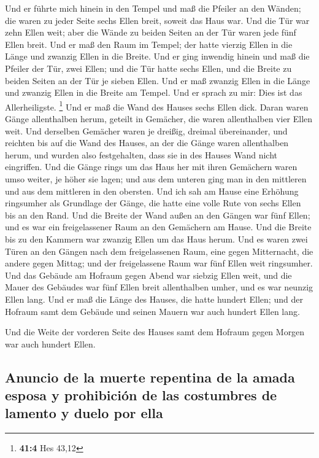  Und er führte mich hinein in den Tempel und maß die
Pfeiler an den Wänden; die waren zu jeder Seite sechs Ellen breit,
soweit das Haus war.  Und die Tür war zehn Ellen weit;
aber die Wände zu beiden Seiten an der Tür waren jede fünf Ellen breit.
Und er maß den Raum im Tempel; der hatte vierzig Ellen in die Länge und
zwanzig Ellen in die Breite.  Und er ging inwendig hinein
und maß die Pfeiler der Tür, zwei Ellen; und die Tür hatte sechs Ellen,
und die Breite zu beiden Seiten an der Tür je sieben Ellen.
 Und er maß zwanzig Ellen in die Länge und zwanzig Ellen
in die Breite am Tempel. Und er sprach zu mir: Dies ist das
Allerheiligste. \footnote{\textbf{41:4} Hes 43,12}  Und er
maß die Wand des Hauses sechs Ellen dick. Daran waren Gänge allenthalben
herum, geteilt in Gemächer, die waren allenthalben vier Ellen weit.
 Und derselben Gemächer waren je dreißig, dreimal
übereinander, und reichten bis auf die Wand des Hauses, an der die Gänge
waren allenthalben herum, und wurden also festgehalten, dass sie in des
Hauses Wand nicht eingriffen.  Und die Gänge rings um das
Haus her mit ihren Gemächern waren umso weiter, je höher sie lagen; und
aus dem unteren ging man in den mittleren und aus dem mittleren in den
obersten.  Und ich sah am Hause eine Erhöhung ringsumher
als Grundlage der Gänge, die hatte eine volle Rute von sechs Ellen bis
an den Rand.  Und die Breite der Wand außen an den Gängen
war fünf Ellen; und es war ein freigelassener Raum an den Gemächern am
Hause.  Und die Breite bis zu den Kammern war zwanzig
Ellen um das Haus herum.  Und es waren zwei Türen an den
Gängen nach dem freigelassenen Raum, eine gegen Mitternacht, die andere
gegen Mittag; und der freigelassene Raum war fünf Ellen weit ringsumher.
 Und das Gebäude am Hofraum gegen Abend war siebzig Ellen
weit, und die Mauer des Gebäudes war fünf Ellen breit allenthalben
umher, und es war neunzig Ellen lang.  Und er maß die
Länge des Hauses, die hatte hundert Ellen; und der Hofraum samt dem
Gebäude und seinen Mauern war auch hundert Ellen lang.

 Und die Weite der vorderen Seite des Hauses samt dem
Hofraum gegen Morgen war auch hundert Ellen.

\hypertarget{anuncio-de-la-muerte-repentina-de-la-amada-esposa-y-prohibiciuxf3n-de-las-costumbres-de-lamento-y-duelo-por-ella}{%
\subsection{Anuncio de la muerte repentina de la amada esposa y
prohibición de las costumbres de lamento y duelo por
ella}\label{anuncio-de-la-muerte-repentina-de-la-amada-esposa-y-prohibiciuxf3n-de-las-costumbres-de-lamento-y-duelo-por-ella}}

